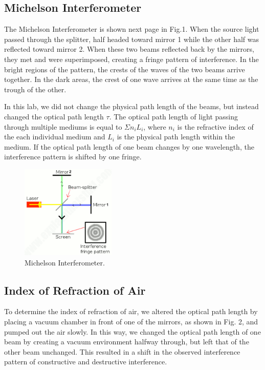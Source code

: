 \documentclass[12pt]{article}
\begin{document}
\subsection{Michelson Interferometer}
The Michelson Interferometer is shown next page in Fig.1. When the source light passed through the splitter, half headed toward mirror 1 while the other half was reflected toward mirror 2. When these two beams reflected back by the mirrors, they met and were superimposed, creating a fringe pattern of interference. In the bright regions of the pattern, the crests of the waves of the two beams arrive together. In the dark areas, the crest of one wave arrives at the same time as the trough of the other. 

In this lab, we did not change the physical path length of the beams, but instead changed the optical path length $\tau$. The optical path length of light passing through multiple mediums is equal to $\Sigma n_{i}L_{i}$, where $n_{i}$ is the refractive index of the each individual medium and $L_{i}$ is the physical path length within the medium. If the optical path length of one beam changes by one wavelength, the interference pattern is shifted by one fringe. 
\begin{figure}[htb]
	\begin{center}
		\includegraphics[width=0.40\textwidth]{picture1} %
		\caption{Michelson Interferometer.}
	\end{center}
\end{figure}

\subsection{Index of Refraction of Air}
To determine the index of refraction of air, we altered the optical path length by placing a vacuum chamber in front of one of the mirrors, as shown in Fig. 2, and pumped out the air slowly. In this way, we changed the optical path length of one beam by creating a vacuum environment halfway through, but left that of the other beam unchanged. This resulted in a shift in the observed interference pattern of constructive and destructive interference. 
\end{document}
